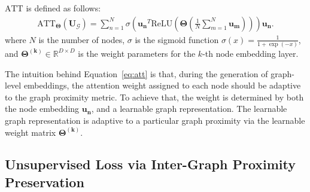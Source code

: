 \documentclass{article}
\begin{document}
$\mathrm{ATT}$ is defined as follows:
\begin{align}
\label{eq:att}
{\mathrm{ATT}_{\bm{\Theta}}} (\bm{U_{\mathcal{G}}}) 
= \sum_{n=1}^{N} \sigma(\bm{u_n}^{T} \mathrm{ReLU}(\bm{\Theta} (\frac{1}{N} \sum_{m=1}^{N} \bm{u_m}))) \bm{u_n}.
\end{align}
where $N$ is the number of nodes, $\sigma$ is the sigmoid function $\sigma(x)=\frac{1}{1+\exp{(-x)}}$, and $\bm{\Theta^{(k)}} \in \mathbb{R}^{D \times D}$ is the weight parameters for the $k$-th node embedding layer. 

The intuition behind Equation~\ref{eq:att} is that, during the generation of graph-level embeddings, the attention weight assigned to each node should be adaptive to the graph proximity metric. To achieve that, the weight is determined by both the node embedding $\bm{u_n}$, and a learnable graph representation.
The learnable graph representation is adaptive to a particular graph proximity via the learnable weight matrix $\bm{\Theta^{(k)}}$. 




\subsection{Unsupervised Loss via Inter-Graph Proximity Preservation}
\end{document}
